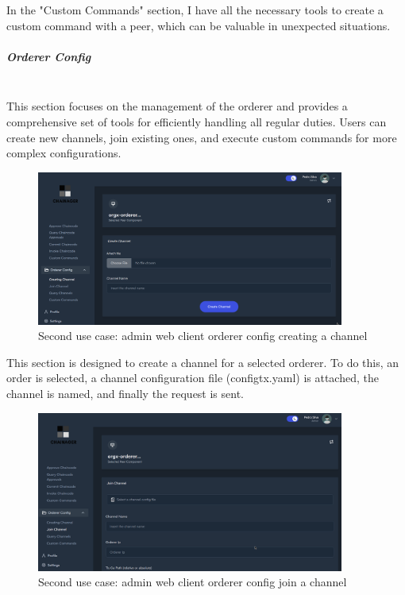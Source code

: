 In the "Custom Commands" section, I have all the necessary tools to create a custom command with a peer, which can be valuable in unexpected situations.

\subparagraph{Orderer Config}\mbox{}\\
This section focuses on the management of the orderer and provides a comprehensive set of tools for efficiently handling all regular duties. Users can create new channels, join existing ones, and execute custom commands for more complex configurations.

\begin{figure}[H]
    \centering
    \includegraphics[width=0.9\textwidth]{assets/use-case-2/orderer-config-creating-channel.png} %
    \caption{Second use case: admin web client orderer config creating a channel}
    \label{fig:sample-image} 
\end{figure}

This section is designed to create a channel for a selected orderer. To do this, an order is selected, a channel configuration file (configtx.yaml) is attached, the channel is named, and finally the request is sent.

\begin{figure}[H]
    \centering
    \includegraphics[width=0.9\textwidth]{assets/use-case-2/orderer-config-join-channel.png} %
    \caption{Second use case: admin web client orderer config join a channel}
    \label{fig:sample-image} 
\end{figure}

